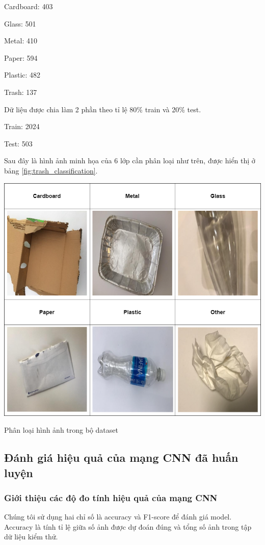 Cardboard: 403

Glass: 501

Metal: 410

Paper: 594

Plastic: 482

Trash: 137
 
Dữ liệu được chia làm 2 phần theo tỉ lệ 80\% train và 20\% test.

Train: 2024

Test: 503

Sau đây là hình ảnh minh họa của 6 lớp cần phân loại như trên, được hiển thị ở bảng \ref{fig:trash_classification}.
\begin{table}[H]
    \centering
    \includegraphics[width=\linewidth]{images/Quanh/Trash Classification.png}
    \caption{Phân loại hình ảnh trong bộ dataset}
    \label{fig:trash_classification}
\end{table}
\subsection{Đánh giá hiệu quả của mạng CNN đã huấn luyện}

\subsubsection{Giới thiệu các độ đo tính hiệu quả của mạng CNN} %
Chúng tôi sử dụng hai chỉ số là accuracy và F1-score để đánh giá model. Accuracy là tính tỉ lệ giữa số ảnh được dự đoán đúng và tổng số ảnh trong tập dữ liệu kiểm thử.

